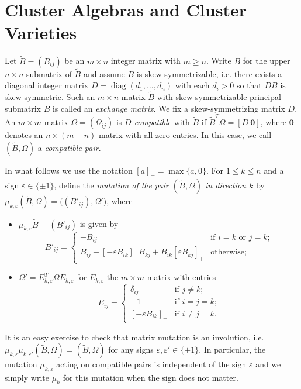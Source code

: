 \documentclass{amsart}
\newcommand{\diag}{\operatorname{diag}}
\renewcommand{\max}{\operatorname{max}}
\begin{document}
\section{Cluster Algebras and Cluster Varieties}
\label{sec:cluster}

Let $\tilde B=(B_{ij})$ be an $m\times n$ integer matrix with $m\ge n$.  
Write $B$ for the upper $n\times n$ submatrix of $\tilde B$ and assume $B$ is skew-symmetrizable, i.e. there exists a diagonal integer matrix $D=\diag(d_1,\ldots,d_n)$ with each $d_i>0$ so that $DB$ is skew-symmetric. 
Such an $m\times n$ matrix $\tilde B$ with skew-symmetrizable principal submatrix $B$ is called an \emph{exchange matrix}.
We fix a skew-symmetrizing matrix $D$.
An $m\times m$ matrix $\Omega=(\Omega_{ij})$ is \emph{$D$-compatible} with $\tilde B$ if $\tilde B^T\Omega=[D\ \boldsymbol{0}]$, where $\boldsymbol{0}$ denotes an $n\times(m-n)$ matrix with all zero entries.
In this case, we call $(\tilde B,\Omega)$ a \emph{compatible pair}.

In what follows we use the notation $[a]_+=\max\{a,0\}$.
For $1\le k\le n$ and a sign $\varepsilon\in\{\pm1\}$, define the \emph{mutation of the pair $(\tilde B,\Omega)$ in direction $k$} by $\mu_{k,\varepsilon}(\tilde B,\Omega)=\big((B'_{ij}),\Omega'\big)$, where
\begin{itemize}
  \item $\mu_{k,\varepsilon}\tilde B=(B'_{ij})$ is given by
    \[B'_{ij}=\begin{cases}-B_{ij} & \text{if $i=k$ or $j=k$;}\\ B_{ij}+[-\varepsilon B_{ik}]_+B_{kj}+B_{ik}[\varepsilon B_{kj}]_+ & \text{otherwise;}\end{cases}\]
  \item $\Omega'=E_{k,\varepsilon}^T\Omega E_{k,\varepsilon}$ for $E_{k,\varepsilon}$ the $m\times m$ matrix with entries
    \[E_{ij}=\begin{cases}\delta_{ij} & \text{if $j\ne k$;}\\ -1 & \text{if $i=j=k$;}\\ [-\varepsilon B_{ik}]_+ & \text{if $i\ne j=k$.}\end{cases}\]
\end{itemize}
It is an easy exercise to check that matrix mutation is an involution, i.e.\ $\mu_{k,\varepsilon}\mu_{k,\varepsilon'}(\tilde B,\Omega)=(\tilde B,\Omega)$ for any signs $\varepsilon,\varepsilon'\in\{\pm1\}$.
In particular, the mutation $\mu_{k,\varepsilon}$ acting on compatible pairs is independent of the sign $\varepsilon$ and we simply write $\mu_k$ for this mutation when the sign does not matter.
\end{document}
